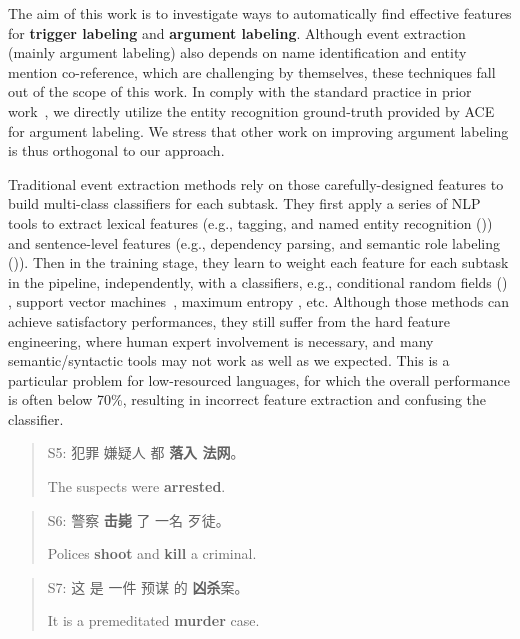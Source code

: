The aim of this work is to investigate ways to automatically find effective features for \textbf{trigger labeling} and \textbf{argument labeling}.
Although event extraction (mainly argument labeling) also depends on name identification and entity mention co-reference, which are challenging by themselves, these techniques fall out of the scope of this work. In comply with the standard practice in prior work~\cite{chen2009language,chen2012joint}, we directly utilize the entity recognition ground-truth provided by ACE for argument labeling. We stress that other work on improving argument labeling is thus orthogonal to our approach.

Traditional event extraction methods \cite{ahn2006stages,chen2009language,li2012employing,chen2012joint} rely on those carefully-designed features to build multi-class classifiers for each subtask. They first apply a series of NLP tools to extract lexical features (e.g., \POS tagging, and named entity recognition (\NER)) and sentence-level features (e.g., dependency parsing, and semantic role labeling (\SRL)). Then in the training stage, they learn to weight each feature for each subtask in the pipeline, independently, with a classifiers, e.g., conditional random fields (\CRF) \cite{lafferty2001conditional}, support vector machines~\cite{suykens1999least}, maximum entropy \cite{phillips2006maximum}, etc. Although those methods can achieve satisfactory performances, they still suffer from the hard feature engineering, where human expert involvement is necessary,  and many semantic/syntactic tools may not work as well as we expected. This is a particular problem for low-resourced languages, for which the overall performance is often below 70\%, resulting in incorrect feature extraction and confusing the classifier.

\begin{quote}
	S5: 犯罪 嫌疑人 都 \textbf{落入 法网}。
	
	\hspace{0.55cm} The suspects were \textbf{arrested}.
\end{quote}
\begin{quote}
	S6: 警察 \textbf{击毙} 了 一名 歹徒。
	
	\hspace{0.55cm} Polices \textbf{shoot} and \textbf{kill} a criminal.
\end{quote}
\begin{quote}
	S7: 这 是 一件 预谋 的 \textbf{凶杀}案。
	
	\hspace{0.55cm} It is a premeditated \textbf{murder} case.
\end{quote}

